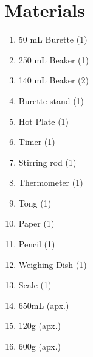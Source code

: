 \documentclass{article}
\begin{document}
\section*{Materials}
\begin{enumerate}
\item 50 mL Burette	(1) \\
\item 250 mL Beaker (1)\\
\item 140 mL Beaker	(2) \\
\item Burette stand (1) \\ 
\item Hot Plate	 (1) \\
\item	Timer (1) \\ 
\item	Stirring rod  (1) \\
\item	Thermometer (1) \\
\item	Tong (1) \\
\item	Paper (1) \\
\item	Pencil (1) \\
\item Weighing Dish (1) \\
\item	Scale (1) \\
\item	650mL  (apx.) \\
\item	120g   (apx.) \\
\item 600g   (apx.)
\end{enumerate}
\end{document}
